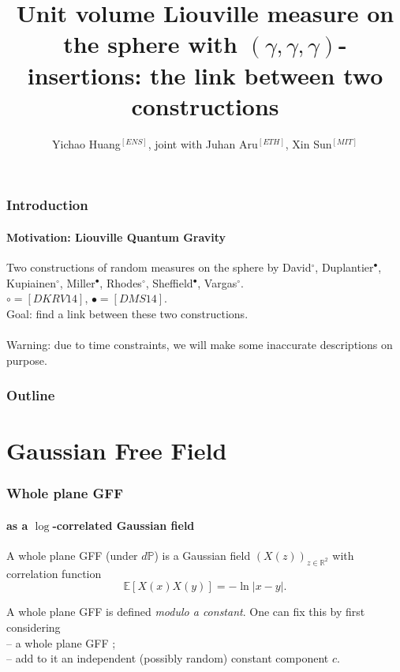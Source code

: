 \documentclass[aspectratio=169]{beamer}
\title[DKRV14 and DMS14]{Unit volume Liouville measure on the sphere with $(\gamma,\gamma,\gamma)$-insertions: the link between two constructions}
\author[Yichao Huang]{Yichao Huang$^{[ENS]}$, joint with Juhan Aru$^{[ETH]}$, Xin Sun$^{[MIT]}$}
\date[IH\'ES, 17 May 2016]{}
\begin{document}
\AtBeginSection{\frame{\sectionpage}}

\begin{frame}
\titlepage
\end{frame}

\begin{frame}
\frametitle{Introduction}
\framesubtitle{Motivation: Liouville Quantum Gravity}
Two constructions of random measures on the sphere by David$^\circ$, Duplantier$^\bullet$, Kupiainen$^\circ$, Miller$^\bullet$, Rhodes$^\circ$, Sheffield$^\bullet$, Vargas$^\circ$.\\
$\circ=[DKRV14]$, $\bullet=[DMS14]$.\\
Goal: find a link between these two constructions.\\
~\\
Warning: due to time constraints, we will make some inaccurate descriptions on purpose.

\end{frame}

\begin{frame}
\frametitle{Outline}
\tableofcontents
\end{frame}


\section{Gaussian Free Field}

\begin{frame}
\frametitle{Whole plane GFF}
\framesubtitle{as a $\log$-correlated Gaussian field}
\begin{definition}
A whole plane GFF (under $d\mathbb{P}$) is a Gaussian field $(X(z))_{z\in\mathbb{R}^2}$ with correlation function
$$\mathbb{E}[X(x)X(y)]=-\ln|x-y|.$$
\end{definition}
A whole plane GFF is defined \emph{modulo a constant}. One can fix this by first considering\\
-- a whole plane GFF ;\\
-- add to it an independent (possibly random) constant component $c$.
\end{frame}
\end{document}
